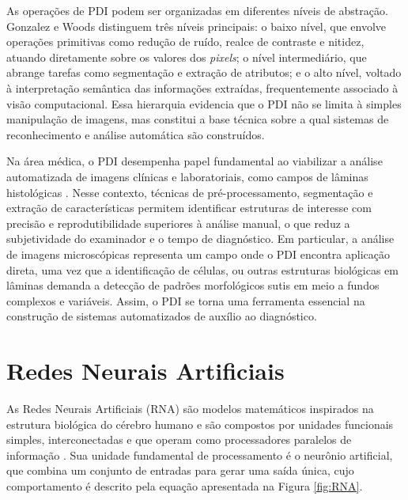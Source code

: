 As operações de PDI podem ser organizadas em diferentes níveis de abstração.
Gonzalez e Woods \cite{gonzalez2008digital} distinguem três níveis principais:
o baixo nível, que envolve operações primitivas como redução de ruído, realce
de contraste e nitidez, atuando diretamente sobre os valores dos \textit{pixels}; o nível intermediário, que abrange tarefas como segmentação e extração de atributos; e o alto nível, voltado à interpretação semântica das informações extraídas, frequentemente associado à visão computacional. Essa hierarquia evidencia que o PDI não se limita à simples manipulação de imagens, mas constitui a base técnica sobre a qual sistemas de reconhecimento e análise
automática são construídos.

Na área médica, o PDI desempenha papel fundamental ao viabilizar a análise
automatizada de imagens clínicas e laboratoriais, como campos de lâminas histológicas \cite{gonzalez2008digital}. Nesse contexto, técnicas de pré-processamento, segmentação e extração de características permitem identificar estruturas de interesse com precisão e
reprodutibilidade superiores à análise manual, o que reduz a subjetividade do
examinador e o tempo de diagnóstico. Em particular, a análise de imagens
microscópicas representa um campo onde o PDI encontra aplicação direta, uma
vez que a identificação de células, ou outras estruturas biológicas
em lâminas demanda a detecção de padrões morfológicos sutis em meio a fundos
complexos e variáveis. Assim, o PDI se torna uma ferramenta essencial na construção de sistemas automatizados de auxílio ao diagnóstico.


\section{Redes Neurais Artificiais}
	
	As Redes Neurais Artificiais (RNA) são modelos matemáticos inspirados na estrutura biológica do cérebro humano e são compostos por unidades funcionais simples, interconectadas e que operam como processadores paralelos de informação \cite{sengupta2020}. Sua unidade fundamental de processamento é o neurônio artificial, que combina um conjunto de entradas para gerar uma saída única, cujo comportamento é descrito pela equação apresentada na Figura \ref{fig:RNA}.
	
	

